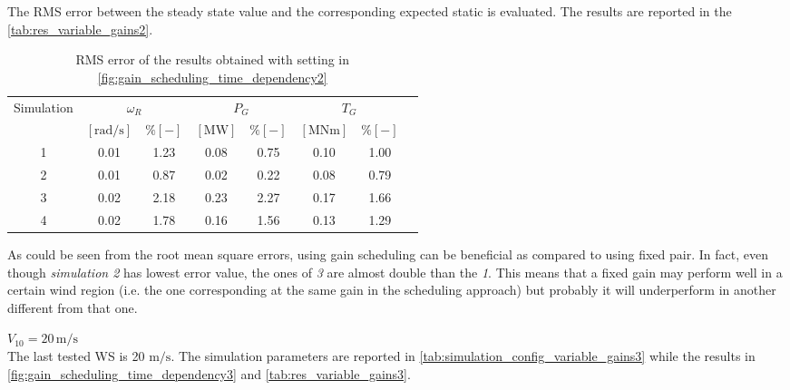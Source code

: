The \acrshort{RMS} error between the steady state value and the corresponding expected static is evaluated. The results are reported in the \autoref{tab:res_variable_gains2}.
\begin{table}[htb]
  \caption{RMS error of the results obtained with setting in \autoref{fig:gain_scheduling_time_dependency2}}
  \centering
  \begin{tabular}{cccccccc}
    \toprule
      Simulation & \multicolumn{2}{c}{$\omega_R$} & \multicolumn{2}{c}{$P_G$} & \multicolumn{2}{c}{$T_G$} \\ 
       & $\left[\si{\radian\per\second}\right]$ & $ \% \left[-\right]$ & $\left[\si{\mega\watt}\right]$ & $ \% \left[-\right]$ & $\left[\si{\mega\newton\meter} \right]$ & $ \% \left[-\right]$ \\ \midrule      
     1 & 0.01 &  1.23 &  0.08  &  0.75  &  0.10  &  1.00 \\
     2 & 0.01 &  0.87 &  0.02  &  0.22  &  0.08  &  0.79 \\
     3 & 0.02 &  2.18 &  0.23  &  2.27  &  0.17  &  1.66 \\
     4 & 0.02 &  1.78 &  0.16  &  1.56  &  0.13  &  1.29 \\
    
     \bottomrule
  \end{tabular}
  \label{tab:res_variable_gains2}
\end{table}

As could be seen from the root mean square errors, using gain scheduling can be beneficial as compared to using fixed pair. In fact, even though \textit{simulation 2} has lowest error value, the ones of \textit{3} are almost double than the \textit{1}. This means that a fixed gain may perform well in a certain wind region (i.e. the one corresponding at the same gain in the scheduling approach) but probably it will underperform in another different from that one.  

\textbf{$V_{10}=20 \, \si{\meter\per\second}$}\\
The last tested \acrshort{WS} is 20 $\si{\meter\per\second}$. The simulation parameters are reported in \autoref{tab:simulation_config_variable_gains3} while the results in \autoref{fig:gain_scheduling_time_dependency3} and \autoref{tab:res_variable_gains3}.


